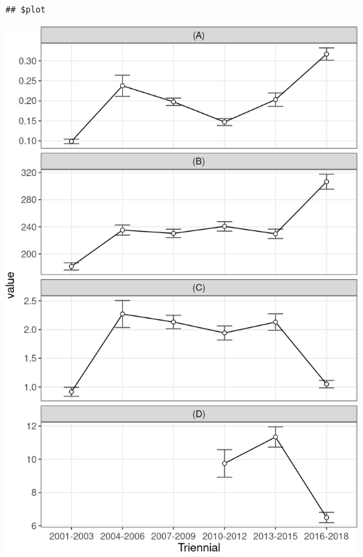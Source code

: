 \documentclass[10pt,landscape,a3paper]{article}
\begin{document}
\begin{verbatim}
## $plot
\end{verbatim}

\begin{center}\includegraphics{img/modelling/aa-eda-ts-9} \end{center}
\end{document}
